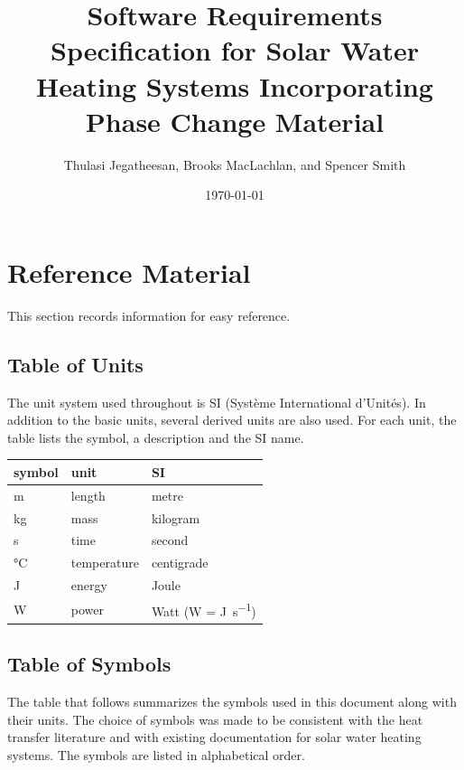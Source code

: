\documentclass[12pt]{article}
\begin{document}
\title{Software Requirements Specification for Solar Water Heating Systems
  Incorporating Phase Change Material} 
\author{Thulasi Jegatheesan, Brooks MacLachlan, and Spencer Smith}
\date{\today}
	
\maketitle

\tableofcontents

\section{Reference Material}

This section records information for easy reference.

\subsection{Table of Units}

The unit system used throughout is SI (Syst\`{e}me International
d'Unit\'{e}s). In addition to the basic units, several derived units are also
used. For each unit, the table lists the symbol, a description and the SI
name.~\newline

\renewcommand{\arraystretch}{1.2}
  \noindent \begin{tabular}{l l l} 
    \toprule		
    \textbf{symbol} & \textbf{unit} & \textbf{SI}\\
    \midrule 
    \si{\metre} & length & metre\\
    \si{\kilogram} & mass	& kilogram\\
    \si{\second} & time & second\\
    \si{\celsius} & temperature & centigrade\\
    \si{\joule} & energy & Joule\\
    \si{\watt} & power & Watt (W = \si{\joule\per\second})\\
    \bottomrule
  \end{tabular}

\subsection{Table of Symbols}

The table that follows summarizes the symbols used in this document along with
their units.  The choice of symbols was made to be consistent with the heat
transfer literature and with existing documentation for solar water heating
systems.  The symbols are listed in alphabetical order.
\end{document}
